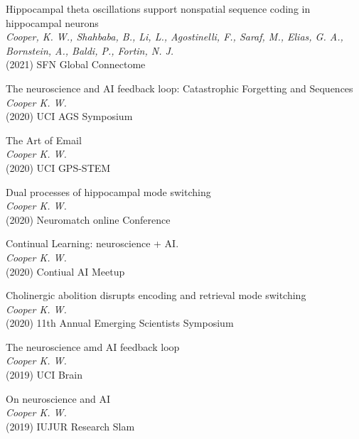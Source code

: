 \documentclass[10pt]{cooperCV2}
\begin{document}
 
\begin{etaremune}[itemindent=-\bibhang, topsep=0pt,
				   itemsep=\bibsep,partopsep=0pt,parsep=0pt,leftmargin={\bibhang+\widthof{[999]}}] 
    
    \item Hippocampal theta oscillations support nonspatial sequence coding in hippocampal neurons \\
     \textit{Cooper, K. W., Shahbaba, B., Li, L., Agostinelli, F., Saraf, M., Elias, G. A., Bornstein, A., Baldi, P.,  Fortin, N. J.}\\
     (2021) SFN Global Connectome
     
	
    \item The neuroscience and AI feedback loop: Catastrophic Forgetting and Sequences \\
     \textit{Cooper K. W.}\\
     (2020) UCI AGS Symposium
     
	
    \item The Art of Email \\
     \textit{Cooper K. W.}\\
     (2020) UCI GPS-STEM
     
	
    \item Dual processes of hippocampal mode switching \\
     \textit{Cooper K. W.}\\
     (2020) Neuromatch online Conference
     
	
    \item Continual Learning: neuroscience + AI. \\
     \textit{Cooper K. W.}\\
     (2020) Contiual AI Meetup
     
	
    \item Cholinergic abolition disrupts encoding and retrieval mode switching \\
     \textit{Cooper K. W.}\\
     (2020) 11th Annual Emerging Scientists Symposium
     
	
    \item The neuroscience amd AI feedback loop \\
     \textit{Cooper K. W.}\\
     (2019) UCI Brain
     
	
    \item On neuroscience and AI \\
     \textit{Cooper K. W.}\\
     (2019) IUJUR Research Slam
     

\end{etaremune}
\end{document}
